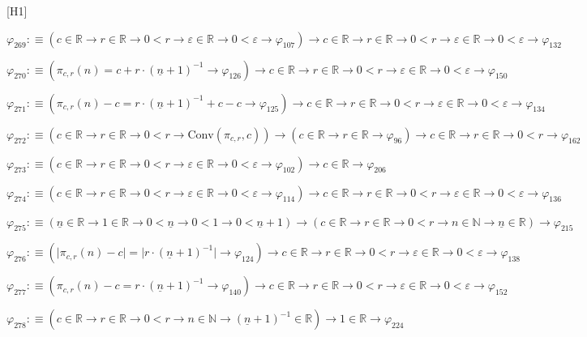 \begin{fullproof}{[H1]}
\begin{abbrevlist}
\item $\varphi_{269} :\equiv (c \in \mathbb{R} \to r \in \mathbb{R} \to 0 < r \to \varepsilon \in \mathbb{R} \to 0 < \varepsilon \to \varphi_{107}) \to c \in \mathbb{R} \to r \in \mathbb{R} \to 0 < r \to \varepsilon \in \mathbb{R} \to 0 < \varepsilon \to \varphi_{132}$
\item $\varphi_{270} :\equiv (\pi_{c,r}(n) = c + r \cdot (\underline{n} + 1)^{-1} \to \varphi_{126}) \to c \in \mathbb{R} \to r \in \mathbb{R} \to 0 < r \to \varepsilon \in \mathbb{R} \to 0 < \varepsilon \to \varphi_{150}$
\item $\varphi_{271} :\equiv (\pi_{c,r}(n) - c = r \cdot (\underline{n} + 1)^{-1} + c - c \to \varphi_{125}) \to c \in \mathbb{R} \to r \in \mathbb{R} \to 0 < r \to \varepsilon \in \mathbb{R} \to 0 < \varepsilon \to \varphi_{134}$
\item $\varphi_{272} :\equiv (c \in \mathbb{R} \to r \in \mathbb{R} \to 0 < r \to \mathrm{Conv}(\pi_{c,r},c)) \to (c \in \mathbb{R} \to r \in \mathbb{R} \to \varphi_{96}) \to c \in \mathbb{R} \to r \in \mathbb{R} \to 0 < r \to \varphi_{162}$
\item $\varphi_{273} :\equiv (c \in \mathbb{R} \to r \in \mathbb{R} \to 0 < r \to \varepsilon \in \mathbb{R} \to 0 < \varepsilon \to \varphi_{102}) \to c \in \mathbb{R} \to \varphi_{206}$
\item $\varphi_{274} :\equiv (c \in \mathbb{R} \to r \in \mathbb{R} \to 0 < r \to \varepsilon \in \mathbb{R} \to 0 < \varepsilon \to \varphi_{114}) \to c \in \mathbb{R} \to r \in \mathbb{R} \to 0 < r \to \varepsilon \in \mathbb{R} \to 0 < \varepsilon \to \varphi_{136}$
\item $\varphi_{275} :\equiv (\underline{n} \in \mathbb{R} \to 1 \in \mathbb{R} \to 0 < \underline{n} \to 0 < 1 \to 0 < \underline{n} + 1) \to (c \in \mathbb{R} \to r \in \mathbb{R} \to 0 < r \to n \in \mathbb{N} \to \underline{n} \in \mathbb{R}) \to \varphi_{215}$
\item $\varphi_{276} :\equiv (\lvert \pi_{c,r}(n) - c \rvert = \lvert r \cdot (\underline{n} + 1)^{-1} \rvert \to \varphi_{124}) \to c \in \mathbb{R} \to r \in \mathbb{R} \to 0 < r \to \varepsilon \in \mathbb{R} \to 0 < \varepsilon \to \varphi_{138}$
\item $\varphi_{277} :\equiv (\pi_{c,r}(n) - c = r \cdot (\underline{n} + 1)^{-1} \to \varphi_{140}) \to c \in \mathbb{R} \to r \in \mathbb{R} \to 0 < r \to \varepsilon \in \mathbb{R} \to 0 < \varepsilon \to \varphi_{152}$
\item $\varphi_{278} :\equiv (c \in \mathbb{R} \to r \in \mathbb{R} \to 0 < r \to n \in \mathbb{N} \to (\underline{n} + 1)^{-1} \in \mathbb{R}) \to 1 \in \mathbb{R} \to \varphi_{224}$

\end{abbrevlist}
\end{fullproof}
